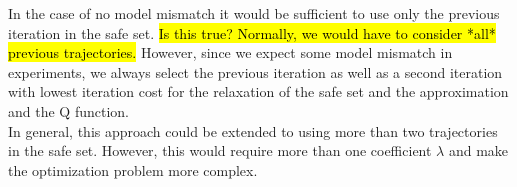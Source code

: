 In the case of no model mismatch it would be sufficient to use only the previous iteration in the safe set. \hl{Is this true? Normally, we would have to consider *all* previous trajectories.}
However, since we expect some model mismatch in experiments, we always select the previous iteration as well as a second iteration with lowest iteration cost for the relaxation of the safe set and the approximation and the Q function.\\
In general, this approach could be extended to using more than two trajectories in the safe set. However, this would require more than one coefficient $\lambda$ and make the optimization problem more complex.

